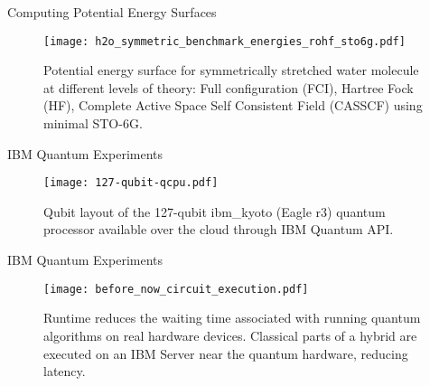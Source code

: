 \begin{frame}{Computing Potential Energy Surfaces}
    \begin{figure}
      \centering
      \texttt{[image: h2o\_symmetric\_benchmark\_energies\_rohf\_sto6g.pdf]}
      \caption{
        Potential energy surface for symmetrically stretched water molecule
        at different levels of theory: Full configuration (FCI), Hartree Fock (HF),
        Complete Active Space Self Consistent Field (CASSCF) using minimal STO-6G.
      }
    \end{figure}
\end{frame}



\begin{frame}{IBM Quantum Experiments}
  \begin{figure}
    \centering
    \texttt{[image: 127-qubit-qcpu.pdf]}
    \caption{Qubit layout of the 127-qubit ibm\_kyoto (Eagle r3) quantum processor available over the cloud through IBM Quantum API.}
  \end{figure}
\end{frame}

\begin{frame}{IBM Quantum Experiments}
  \begin{figure}
    \centering
    \texttt{[image: before\_now\_circuit\_execution.pdf]}
    \caption{
      Runtime reduces the waiting time associated with running quantum
      algorithms on real hardware devices. Classical parts of a hybrid are
      executed on an IBM Server near the quantum hardware, reducing latency.
    }
  \end{figure}
\end{frame}

